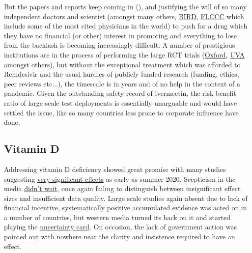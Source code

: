 \documentclass[11pt,a4paper]{article}
\begin{document}
But the papers and reports keep coming in (\cite{Bryant2021-ww}), and justifying the will of so many independent doctors and scientist (amongst many others, \href{Bryant2021-ww}{BIRD}, \href{https://covid19criticalcare.com/ivermectin-in-covid-19/}{FLCCC} which include some of the most cited physicians in the world) to push for a drug which they have no financial (or other) interest in promoting and everything to lose from the backlash is becoming increasingly difficult. A number of prestigious institutions are in the process of performing the large RCT trials (\href{https://www.principletrial.org/news/ivermectin-to-be-investigated-as-a-possible-treatment-for-covid-19-in-oxford2019s-principle-trial}{Oxford}, \href{https://news.virginia.edu/content/uva-health-joins-national-trial-testing-medications-mild-moderate-covid-19}{UVA} amongst others), but without the exceptional treatment which was afforded to Remdesivir and the usual hurdles of publicly funded research (funding, ethics, peer reviews etc...), the timescale is in years and of no help in the context of a pandemic. Given the outstanding safety record of ivermectin, the risk benefit ratio of large scale test deployments is essentially unarguable and would have settled the issue, like so many countries less prone to corporate influence have done.

\subsection*{Vitamin D}

Addressing vitamin D deficiency showed great promise with many studies suggesting \href{https://c19vitamind.com/}{very significant effects} as early as summer 2020. Scepticism in the media \href{https://www.theguardian.com/world/2020/jun/29/no-evidence-that-taking-vitamin-d-prevents-coronavirus-say-experts}{didn't wait}, once again failing to distinguish between insignificant effect sizes and insufficient data quality. Large scale studies again absent due to lack of financial incentive, systematically positive accumulated evidence was acted on in a number of countries, but western media turned its back on it and started playing the \href{https://www.theguardian.com/world/2021/mar/09/vitamin-d-supplements-may-offer-no-covid-benefits-data-suggests}{uncertainty card}. On occasion, the lack of government action was \href{https://www.theguardian.com/lifeandstyle/2021/jan/10/does-vitamin-d-combat-covid}{pointed out} with nowhere near the clarity and insistence required to have an effect.
\end{document}
